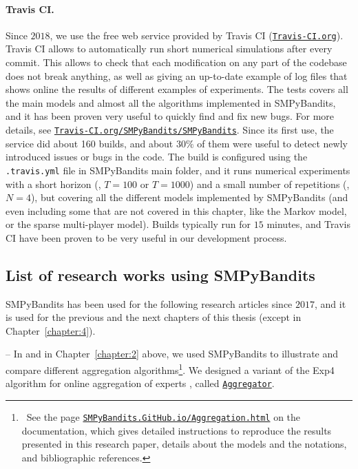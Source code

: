 \paragraph{Travis CI.}
Since $2018$, we use the free web service provided by Travis CI (\href{https://travis-ci.org/}{\texttt{Travis-CI.org}}).
Travis CI allows to automatically run short numerical simulations after every commit.
This allows to check that each modification on any part of the codebase does not break anything, as well as giving an up-to-date example of log files that shows online the results of different examples of experiments. The tests covers all the main models and almost all the algorithms implemented in SMPyBandits, and it has been proven very useful to quickly find and fix new bugs.
For more details, see \href{https://travis-ci.org/SMPyBandits/SMPyBandits}{\texttt{Travis-CI.org/SMPyBandits/SMPyBandits}}.
%
Since its first use, the service did about 160 builds, and about $30\%$ of them were useful to detect newly introduced issues or bugs in the code.
The build is configured using the \texttt{.travis.yml} file in SMPyBandits main folder, and it runs numerical experiments with a short horizon (\eg, $T=100$ or $T=1000$) and a small number of repetitions (\ie, $N=4$), but covering all the different models implemented by SMPyBandits (and even including some that are not covered in this chapter, like the Markov model, or the sparse multi-player model).
Builds typically run for $15$ minutes, and Travis CI have been proven to be very useful in our development process.



\subsection{List of research works using SMPyBandits}

SMPyBandits has been used for the following research articles since $2017$, and it is used for the previous and the next chapters of this thesis (except in Chapter~\ref{chapter:4}).

-- In \cite{Besson2018WCNC} and in Chapter~\ref{chapter:2} above, we used SMPyBandits to illustrate and compare different aggregation algorithms\footnote{~See the page \texttt{\href{https://SMPyBandits.GitHub.io/Aggregation.html}{SMPyBandits.GitHub.io/Aggregation.html}} on the documentation, which gives detailed instructions to reproduce the results presented in this research paper, details about the models and the notations, and bibliographic references.}. We designed a variant of the Exp4 algorithm for online aggregation of experts \cite{Bubeck12}, called \texttt{\href{https://SMPyBandits.GitHub.io/docs/Policies.Aggregator.html}{Aggregator}}.

